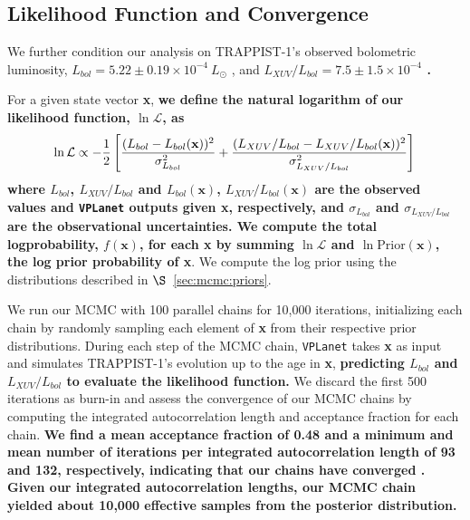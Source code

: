 \documentclass[twocolumn]{aastex62}
\newcommand{\xxx}[1]{{\textbf{#1}}}
\newcommand{\vplanet}[0]{\texttt{VPLanet}\xspace}
\begin{document}
\subsection{Likelihood Function and Convergence} \label{sec:mcmc:like}

We further condition our analysis on TRAPPIST-1's observed bolometric luminosity, $L_{bol} = 5.22 \pm{0.19} \times 10^{-4} \ L_{\odot}$ \citep[][but see also \citet{Gonzales2019}]{vanGrootel2018}, and \xxx{$L_{XUV}/L_{bol} = 7.5 \pm{1.5} \times 10^{-4}$ \citep{Wheatley2017}.} 

For a given state vector \textbf{x}, \xxx{we define the natural logarithm of our likelihood function, $\ln \mathcal{L}$, as}
\small
\begin{equation} \label{eqn:lnlike}
    \ln \mathcal{L} \propto -\frac{1}{2} \left[ \frac{(L_{bol} - L_{bol}(\textbf{x}))^2}{\sigma_{L_{bol}}^2} + \frac{(L_{XUV}/L_{bol} - L_{XUV}/L_{bol}(\textbf{x}))^2}{\sigma_{L_{XUV}/L_{bol}}^2} \right] \\
\end{equation}
\normalsize
\xxx{where $L_{bol}$, $L_{XUV}/L_{bol}$ and $L_{bol}(\textbf{x})$, $L_{XUV}/L_{bol}(\textbf{x})$ are the observed values and \vplanet outputs given \textbf{x}, respectively, and $\sigma_{L_{bol}}$ and $\sigma_{L_{XUV}/L_{bol}}$ are the observational uncertainties. We compute the total logprobability, $f(\textbf{x})$, for each \textbf{x} by summing $\ln \mathcal{L}$ and $\ln \mathrm{Prior}(\textbf{x})$, the log prior probability of \textbf{x}}. We compute the log prior using the distributions described in $\S$~\ref{sec:mcmc:priors}. 

We run our MCMC with 100 parallel chains for 10,000 iterations, initializing each chain by randomly sampling each element of \textbf{x} from their respective prior distributions. During each step of the MCMC chain, \vplanet takes \textbf{x} as input and simulates TRAPPIST-1's evolution up to the age in \textbf{x}, \xxx{predicting $L_{bol}$ and $L_{XUV}/L_{bol}$ to evaluate the likelihood function.} We discard the first 500 iterations as burn-in and assess the convergence of our MCMC chains by computing the integrated autocorrelation length and acceptance fraction for each chain. \xxx{We find a mean acceptance fraction of 0.48 and a minimum and mean number of iterations per integrated autocorrelation length of 93 and 132, respectively, indicating that our chains have converged \citep{ForemanMackey2013}. Given our integrated autocorrelation lengths, our MCMC chain yielded about 10,000 effective samples from the posterior distribution.}
\end{document}
